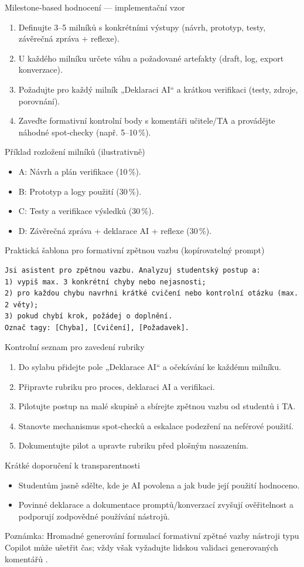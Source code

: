 Milestone‑based hodnocení — implementační vzor
\begin{enumerate}
  \item Definujte 3–5 milníků s konkrétními výstupy (návrh, prototyp, testy, závěrečná zpráva + reflexe).
  \item U každého milníku určete váhu a požadované artefakty (draft, log, export konverzace).
  \item Požadujte pro každý milník „Deklaraci AI“ a krátkou verifikaci (testy, zdroje, porovnání).
  \item Zaveďte formativní kontrolní body s komentáři učitele/TA a provádějte náhodné spot‑checky (např. 5–10\,\%).
\end{enumerate}

Příklad rozložení milníků (ilustrativně)
\begin{itemize}
  \item A: Návrh a plán verifikace (10\,\%).
  \item B: Prototyp a logy použití (30\,\%).
  \item C: Testy a verifikace výsledků (30\,\%).
  \item D: Závěrečná zpráva + deklarace AI + reflexe (30\,\%).
\end{itemize}

Praktická šablona pro formativní zpětnou vazbu (kopírovatelný prompt)
\begin{verbatim}
Jsi asistent pro zpětnou vazbu. Analyzuj studentský postup a:
1) vypiš max. 3 konkrétní chyby nebo nejasnosti;
2) pro každou chybu navrhni krátké cvičení nebo kontrolní otázku (max. 2 věty);
3) pokud chybí krok, požádej o doplnění.
Označ tagy: [Chyba], [Cvičení], [Požadavek].
\end{verbatim}

Kontrolní seznam pro zavedení rubriky
\begin{enumerate}
  \item Do sylabu přidejte pole „Deklarace AI“ a očekávání ke každému milníku.
  \item Připravte rubriku pro proces, deklaraci AI a verifikaci.
  \item Pilotujte postup na malé skupině a sbírejte zpětnou vazbu od studentů i TA.
  \item Stanovte mechanismus spot‑checků a eskalace podezření na neférové použití.
  \item Dokumentujte pilot a upravte rubriku před plošným nasazením.
\end{enumerate}

Krátké doporučení k transparentnosti
\begin{itemize}
  \item Studentům jasně sdělte, kde je AI povolena a jak bude její použití hodnoceno.
  \item Povinné deklarace a dokumentace promptů/konverzací zvyšují ověřitelnost a podporují zodpovědné používání nástrojů.
\end{itemize}

Poznámka: Hromadné generování formulací formativní zpětné vazby nástroji typu Copilot může ušetřit čas; vždy však vyžadujte lidskou validaci generovaných komentářů \cite{kb_ai_101_tipu_pdf_04e4a115_page_21_2}.